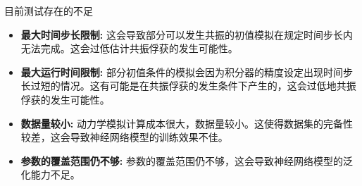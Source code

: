 \documentclass{beamer}		%
\begin{document}
\begin{frame}{目前测试存在的不足}
    \begin{itemize}
        \item \textbf{最大时间步长限制:} 这会导致部分可以发生共振的初值模拟在规定时间步长内无法完成。这会过低估计共振俘获的发生可能性。
        \item \textbf{最大运行时间限制:} 部分初值条件的模拟会因为积分器的精度设定出现时间步长过短的情况。这有可能是在共振俘获的发生条件下产生的，这会过低地共振俘获的发生可能性。
        \item \textbf{数据量较小:} 动力学模拟计算成本很大，数据量较小。这使得数据集的完备性较差，这会导致神经网络模型的训练效果不佳。
        \item \textbf{参数的覆盖范围仍不够:} 参数的覆盖范围仍不够，这会导致神经网络模型的泛化能力不足。
        
    \end{itemize}
    


\end{frame}
\end{document}
